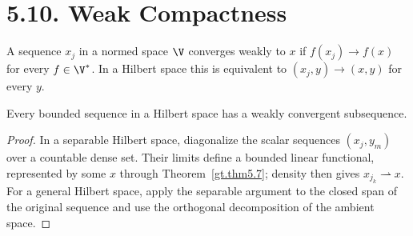 \section*{5.10. Weak Compactness}

\begin{definition}\label{gt.def5.10.weak-convergence}
A sequence $x_j$ in a normed space $\V$ converges weakly to $x$ if
$f(x_j)\to f(x)$ for every $f\in\V^*$. In a Hilbert space this is equivalent
to $(x_j,y)\to(x,y)$ for every $y$.
\end{definition}

\begin{theorem}\label{gt.thm5.12}
Every bounded sequence in a Hilbert space has a weakly convergent subsequence.
\end{theorem}
\begin{proof}
\sketch In a separable Hilbert space, diagonalize the scalar sequences
$(x_j,y_m)$ over a countable dense set. Their limits define a bounded linear
functional, represented by some $x$ through Theorem~\ref{gt.thm5.7}; density
then gives $x_{j_k}\rightharpoonup x$. For a general Hilbert space, apply the
separable argument to the closed span of the original sequence and use the
orthogonal decomposition of the ambient space.
\end{proof}
